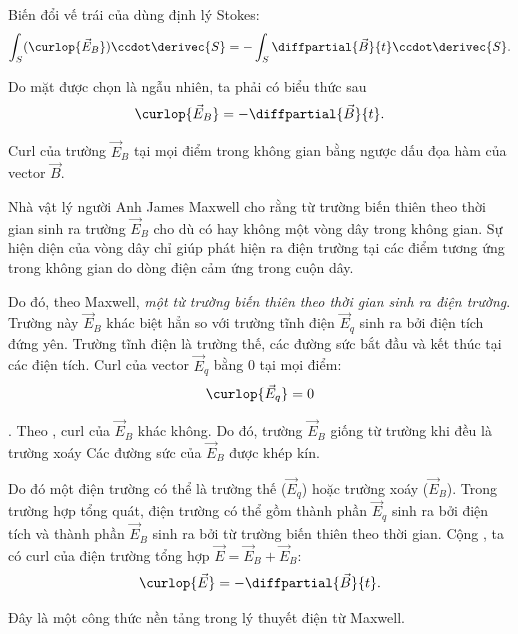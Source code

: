 Biến đổi vế trái của  dùng định lý Stokes:
\begin{equation*}
    \int_S (\curlop{\vec{E}_B}) \ccdot \derivec{S} = - \int_S \diffpartial{\vec{B}}{t} \ccdot \derivec{S}.
\end{equation*}

\noindent
Do mặt được chọn là ngẫu nhiên, ta phải có biểu thức sau
\begin{equation}\label{eq:9_3}
    \curlop{\vec{E}_B} = - \diffpartial{\vec{B}}{t}.
\end{equation}

\noindent
Curl của trường $\vec{E}_B$ tại mọi điểm trong không gian bằng ngược dấu đọa hàm của vector $\vec{B}$.

Nhà vật lý người Anh James Maxwell cho rằng từ trường biến thiên theo thời gian sinh ra trường $\vec{E}_B$ cho dù có hay không một vòng dây trong không gian.
Sự hiện diện của vòng dây chỉ giúp phát hiện ra điện trường tại các điểm tương ứng trong không gian do dòng điện cảm ứng trong cuộn dây.

Do đó, theo Maxwell, \textit{một từ trường biến thiên theo thời gian sinh ra điện trường}.
Trường này $\vec{E}_B$ khác biệt hẳn so với trường tĩnh điện $\vec{E}_q$ sinh ra bởi điện tích đứng yên.
Trường tĩnh điện là trường thế, các đường sức bắt đầu và kết thúc tại các điện tích.
Curl của vector $\vec{E}_q$ bằng 0 tại mọi điểm:
\begin{equation}\label{eq:9_4}
    \curlop{\vec{E}_q} = 0
\end{equation}

.
Theo , curl của $\vec{E}_B$ khác không.
Do đó, trường $\vec{E}_B$ giống từ trường khi đều là trường xoáy
Các đường sức của $\vec{E}_B$ được khép kín.

Do đó một điện trường có thể là trường thế ($\vec{E}_q$) hoặc trường xoáy ($\vec{E}_B$).
Trong trường hợp tổng quát, điện trường có thể gồm thành phần $\vec{E}_q$ sinh ra bởi điện tích và thành phần $\vec{E}_B$ sinh ra bởi từ trường biến thiên theo thời gian.
Cộng , ta có curl của điện trường tổng hợp $\vec{E}=\vec{E}_B+\vec{E}_B$:
\begin{equation}\label{eq:9_5}
    \curlop{\vec{E}} = - \diffpartial{\vec{B}}{t}.
\end{equation}

\noindent
Đây là một công thức nền tảng trong lý thuyết điện từ Maxwell.

